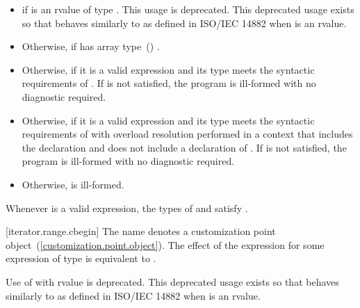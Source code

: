 \begin{itemize}
\item
   if  is an rvalue of
  type . This usage is deprecated.
  \enternote This deprecated usage exists so that
   behaves similarly to 
  as defined in ISO/IEC 14882 when  is an rvalue. \exitnote

\item
  Otherwise,  if  has array
  type~() .

\item
  Otherwise,  if it is a valid expression and its type  meets the
  syntactic requirements of
  . If
   is not satisfied, the program is ill-formed with
  no diagnostic required.

\item
  Otherwise,  if it is a valid expression and its type  meets the
  syntactic requirements of
   with overload
  resolution performed in a context that includes the declaration
   and does not include
  a declaration of . If  is not
  satisfied, the program is ill-formed with no diagnostic required.

\item
  Otherwise,  is ill-formed.
\end{itemize}

\pnum
\enternote Whenever  is a valid expression, the
types of  and  satisfy
. \exitnote

[iterator.range.cbegin]{}
\pnum
The name  denotes a customization point
object~(\ref{customization.point.object}). The effect of the expression
 for some expression  of type 
is equivalent to .

\pnum
Use of  with rvalue  is deprecated.
\enternote This deprecated usage exists so that 
behaves similarly to  as defined in ISO/IEC 14882 when
 is an rvalue. \exitnote

